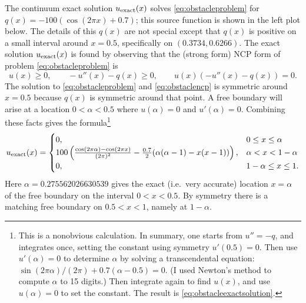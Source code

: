\documentclass[11pt]{article}
\begin{document}
The continuum exact solution $u_{\text{exact}}(x)$ solves \eqref{eq:obstacleproblem} for $q(x) = -100 (\cos(2\pi x) + 0.7)$; this source function is shown in the left plot below.  The details of this $q(x)$ are not special except that $q(x)$ is positive on a small interval around $x=0.5$, specifically on $(0.3734,0.6266)$.  The exact solution $u_{\text{exact}}(x)$ is found by observing that the (strong form) NCP form of problem \eqref{eq:obstacleproblem} is
\begin{equation}
u(x) \ge 0, \qquad - u''(x) - q(x) \ge 0, \qquad u(x) (- u''(x) - q(x)) = 0.  \label{eq:obstaclencp}
\end{equation}
The solution to \eqref{eq:obstacleproblem} and \eqref{eq:obstaclencp} is symmetric around $x=0.5$ because $q(x)$ is symmetric around that point.  A free boundary \cite{KinderlehrerStampacchia1980} will arise at a location $0<\alpha<0.5$ where $u(\alpha)=0$ and $u'(\alpha)=0$.  Combining these facts gives the formula\footnote{This is a nonobvious calculation.  In summary, one starts from $u''=-q$, and integrates once, setting the constant using symmetry $u'(0.5)=0$.  Then use $u'(\alpha)=0$ to determine $\alpha$ by solving a transcendental equation: $\sin(2\pi \alpha)/(2 \pi) + 0.7 (\alpha - 0.5)=0$.  (I used Newton's method to compute $\alpha$ to 15 digits.)  Then integrate again to find $u(x)$, and use $u(\alpha)=0$ to set the constant.  The result is \eqref{eq:obstacleexactsolution}.}
\begin{equation}
u_{\text{exact}}(x) = \begin{cases} 0, & 0 \le x \le \alpha \\
                        100 \left(\frac{\cos(2\pi\alpha) - \cos(2\pi x)}{(2\pi)^2} - \frac{0.7}{2} (\alpha (\alpha-1) - x (x-1))\right), & \alpha < x < 1-\alpha \\
                        0, & 1-\alpha \le x \le 1. \end{cases}  \label{eq:obstacleexactsolution}
\end{equation}
Here $\alpha=0.275562026630539$ gives the exact (i.e.~very accurate) location $x=\alpha$ of the free boundary on the interval $0<x<0.5$.  By symmetry there is a matching free boundary on $0.5<x<1$, namely at $1-\alpha$.
\end{document}
